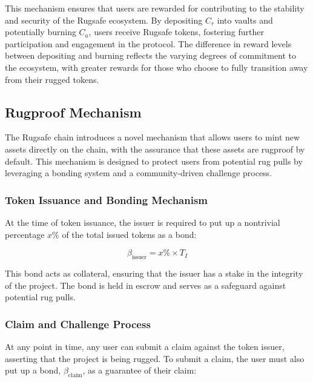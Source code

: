 \documentclass{article}
\begin{document}
This mechanism ensures that users are rewarded for contributing to the stability and security of the Rugsafe ecosystem. By depositing $C_r$ into vaults and potentially burning $C_a$, users receive Rugsafe tokens, fostering further participation and engagement in the protocol. The difference in reward levels between depositing and burning reflects the varying degrees of commitment to the ecosystem, with greater rewards for those who choose to fully transition away from their rugged tokens.













\subsection{Rugproof Mechanism}

The Rugsafe chain introduces a novel mechanism that allows users to mint new assets directly on the chain, with the assurance that these assets are rugproof by default. This mechanism is designed to protect users from potential rug pulls by leveraging a bonding system and a community-driven challenge process.

\subsubsection{Token Issuance and Bonding Mechanism}

At the time of token issuance, the issuer is required to put up a nontrivial percentage \(x\%\) of the total issued tokens as a bond:

\[
\beta_{\text{issuer}} = x\% \times T_I
\]

This bond acts as collateral, ensuring that the issuer has a stake in the integrity of the project. The bond is held in escrow and serves as a safeguard against potential rug pulls.

\subsubsection{Claim and Challenge Process}

At any point in time, any user can submit a claim against the token issuer, asserting that the project is being rugged. To submit a claim, the user must also put up a bond, \(\beta_{\text{claim}}\), as a guarantee of their claim:
\end{document}
